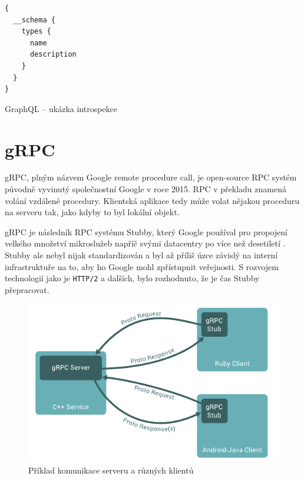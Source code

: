 \documentclass[thesis=M,czech]{FITthesis}[2019/12/23]
\begin{document}
\begin{listing}[H]
\begin{verbatim}
{
  __schema {
    types {
      name
      description 
    }
  }
}
\end{verbatim}
\caption{GraphQL -- ukázka introspekce}
\label{lst:graphql_introspection}
\end{listing}

\section{gRPC}
gRPC, plným názvem Google remote procedure call, je open-source RPC systém původně vyvinutý společnostní Google v roce 2015. RPC v překladu znamená volání vzdálené procedury. Klientská aplikace tedy může volat nějakou proceduru na serveru tak, jako kdyby to byl lokální objekt.

gRPC je následník RPC systému Stubby, který Google používal pro propojení velkého množství mikroslužeb napříč svými datacentry po více než desetiletí \cite{grpc}. Stubby ale nebyl nijak standardizován a byl až příliš úzce závislý na interní infrastruktuře na to, aby ho Google mohl zpřístupnit veřejnosti. S rozvojem technologií jako je \texttt{HTTP/2} a dalších, bylo rozhodnuto, že je čas Stubby přepracovat.

\begin{figure}[H]
    \includegraphics[width=\linewidth]{img/grpc-overview.png}
    \caption{Příklad komunikace serveru a různých klientů}
	\label{grpc-overview}
\end{figure}
\end{document}
